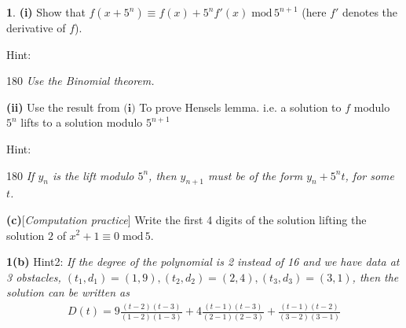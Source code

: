 \documentclass[11pt]{article}
\theoremstyle{definition}
\newtheorem{pb}{}
\begin{document}
\begin{pb}
    \textbf{(i)} Show that \(f(x + 5^n) \equiv f(x) + 5^nf'(x) \;\text{mod}\,5^{n+1}\) (here \(f'\) denotes the derivative of \(f\)).

    \vspace{0.1cm}
    Hint: \begin{rotate}{180}
        \hspace{-4.5cm} \emph{Use the Binomial theorem.}
    \end{rotate}
    \vspace{0.1cm}

    \textbf{(ii)} Use the result from \(\textbf{(i)}\) To prove Hensels lemma. i.e. a solution to \(f\) modulo \(5^n\) lifts to a solution modulo \(5^{n+1}\)

    \vspace{0.1cm}
    Hint: \begin{rotate}{180}
        \hspace{-13.3cm} \emph{If \(y_n\) is the lift modulo \(5^n\), then \(y_{n+1}\) must be of the form \(y_n + 5^nt\), for some \(t\).}
    \end{rotate}
    \vspace{0.1cm}

    \textbf{(c)}[\emph{Computation practice}] Write the first 4 digits of the solution lifting the solution \(2\) of \(x^2 + 1 \equiv 0 \;\text{mod}\,5\).
\end{pb}

\vspace{5cm}

\textbf{1(b)} Hint2: \emph{If the degree of the polynomial is 2 instead of 16 and we have data at 3 obstacles, \((t_1,d_1) = (1,9),(t_2,d_2) = (2,4),(t_3,d_3) = (3,1)\), then the solution can be written as}
    \begin{align*}
        D(t) = 9\frac{(t-2)(t-3)}{(1-2)(1-3)} + 4\frac{(t-1)(t-3)}{(2-1)(2-3)} + \frac{(t-1)(t-2)}{(3-2)(3-1)}
    \end{align*}
    \vspace{0.1cm}
\end{document}
